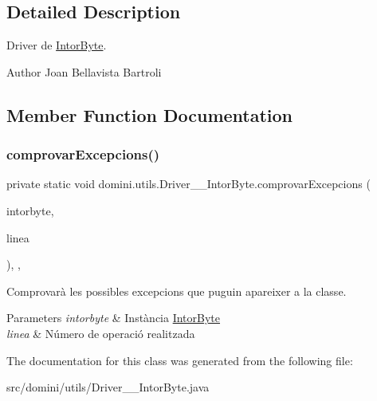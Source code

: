 \subsection{Detailed Description}
Driver de \hyperlink{classdomini_1_1utils_1_1IntorByte}{Intor\+Byte}. 

\begin{DoxyAuthor}{Author}
Joan Bellavista Bartroli 
\end{DoxyAuthor}


\subsection{Member Function Documentation}
\mbox{\label{classdomini_1_1utils_1_1Driver____IntorByte_a3cb28e1e1b318e0b8e4809ebd171c8b2}} 
\subsubsection{\texorpdfstring{comprovar\+Excepcions()}{comprovarExcepcions()}}
{\footnotesize\ttfamily private static void domini.\+utils.\+Driver\+\_\+\+\_\+\+Intor\+Byte.\+comprovar\+Excepcions (\begin{DoxyParamCaption}\item[{\hyperlink{classdomini_1_1utils_1_1IntorByte}{Intor\+Byte}}]{intorbyte,  }\item[{String}]{linea }\end{DoxyParamCaption})\hspace{0.3cm}{\ttfamily [inline]}, {\ttfamily [static]}, {\ttfamily [private]}}



Comprovarà les possibles excepcions que puguin apareixer a la classe. 


\begin{DoxyParams}{Parameters}
{\em intorbyte} & Instància \hyperlink{classdomini_1_1utils_1_1IntorByte}{Intor\+Byte} \\
\hline
{\em linea} & Número de operació realitzada \\
\hline
\end{DoxyParams}


The documentation for this class was generated from the following file\+:\begin{DoxyCompactItemize}
\item 
src/domini/utils/Driver\+\_\+\+\_\+\+Intor\+Byte.\+java\end{DoxyCompactItemize}
